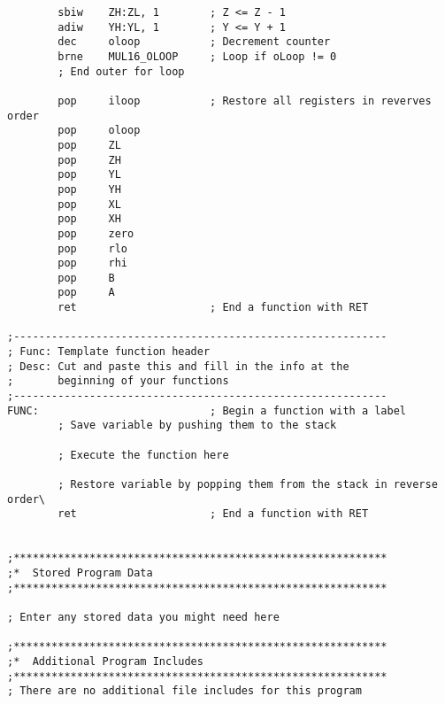 \documentclass[12pt,letterpaper]{article}
\begin{document}
\begin{verbatim}
        sbiw    ZH:ZL, 1        ; Z <= Z - 1
        adiw    YH:YL, 1        ; Y <= Y + 1
        dec     oloop           ; Decrement counter
        brne    MUL16_OLOOP     ; Loop if oLoop != 0
        ; End outer for loop

        pop     iloop           ; Restore all registers in reverves order
        pop     oloop
        pop     ZL
        pop     ZH
        pop     YL
        pop     YH
        pop     XL
        pop     XH
        pop     zero
        pop     rlo
        pop     rhi
        pop     B
        pop     A
        ret                     ; End a function with RET

;-----------------------------------------------------------
; Func: Template function header
; Desc: Cut and paste this and fill in the info at the
;       beginning of your functions
;-----------------------------------------------------------
FUNC:                           ; Begin a function with a label
        ; Save variable by pushing them to the stack

        ; Execute the function here

        ; Restore variable by popping them from the stack in reverse order\
        ret                     ; End a function with RET


;***********************************************************
;*  Stored Program Data
;***********************************************************

; Enter any stored data you might need here

;***********************************************************
;*  Additional Program Includes
;***********************************************************
; There are no additional file includes for this program

\end{verbatim}
\end{document}
